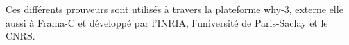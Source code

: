 \noindent Ces différents prouveurs sont utilisés à travers la plateforme why-3, externe elle aussi à Frama-C et développé par l'INRIA, l'université de Paris-Saclay et le CNRS.















